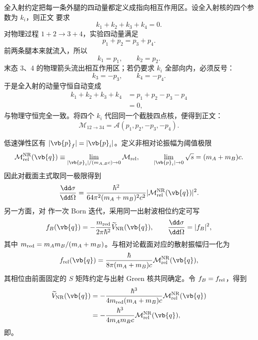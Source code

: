 \begin{derivation}[全入射振幅与物理散射通道]
全入射约定把每一条外腿的四动量都定义成指向相互作用区。设全入射核的四个参数为 $k_i$，则正文 要求
\[
k_1+k_2+k_3+k_4=0.
\]
对物理过程 $1+2\to3+4$，实验四动量满足
\[
p_1+p_2=p_3+p_4.
\]
前两条腿本来就流入，所以
\[
k_1=p_1,\qquad k_2=p_2.
\]
末态 3、4 的物理箭头流出相互作用区；若仍要求 $k_i$ 全部向内，必须反号：
\[
k_3=-p_3,\qquad k_4=-p_4.
\]
于是全入射的动量守恒自动变成
\begin{align*}
k_1+k_2+k_3+k_4
&=p_1+p_2-p_3-p_4\\
&=0,
\end{align*}
与物理守恒完全一致。将四个 $k_i$ 代回同一个截肢四点核，便得到正文：
\[
\mathcal M_{12\to34}
=\mathcal A(p_1,p_2,-p_3,-p_4).
\]
\end{derivation}

\begin{derivation}[低速散射振幅与势能的匹配]
低速弹性区有 $|\vb{p}_f|=|\vb{p}_i|$。定义非相对论振幅为阈值极限
\begin{equation*}
\mathcal M_{\rm rel}^{\rm NR}(\vb{q})
\equiv\lim_{|\vb{p}_i|/(m_{A,B}c)\to0}\mathcal M_{\rm rel},
\qquad
\lim_{|\vb{p}_i|\to0}\sqrt{s}=(m_A+m_B)c.
\end{equation*}
因此对截面主式取同一极限得到
\begin{equation*}
 \frac{\dd\sigma}{\dd\Omega}
 =\frac{\hbar^2}{64\pi^2(m_A+m_B)^2c^2}
 |\mathcal M_{\rm rel}^{\rm NR}(\vb{q})|^2.
\end{equation*}
另一方面，对 作一次 Born 迭代，采用同一出射波相位约定可写
\begin{equation*}
 f_B(\vb{q})
 =-\frac{m_{\rm red}}{2\pi\hbar^2}
 \widetilde V_{\rm NR}(\vb{q}),
 \qquad
 \frac{\dd\sigma}{\dd\Omega}=|f_B|^2,
\end{equation*}
其中 $m_{\rm red}=m_Am_B/(m_A+m_B)$。与相对论截面对应的散射振幅归一化为
\begin{equation*}
 f_{\rm rel}(\vb{q})
 =\frac{\hbar}{8\pi(m_A+m_B)c}
 \mathcal M_{\rm rel}^{\rm NR}(\vb{q}),
\end{equation*}
其相位由前面固定的 $S$ 矩阵约定与出射 Green 核共同确定。令 $f_B=f_{\rm rel}$，得到
\begin{align*}
 \widetilde V_{\rm NR}(\vb{q})
 &=-\frac{\hbar^3}{4m_{\rm red}(m_A+m_B)c}
 \mathcal M_{\rm rel}^{\rm NR}(\vb{q})\\
 &=-\frac{\hbar^3}{4m_Am_Bc}
 \mathcal M_{\rm rel}^{\rm NR}(\vb{q}),
\end{align*}
即。
\end{derivation}

